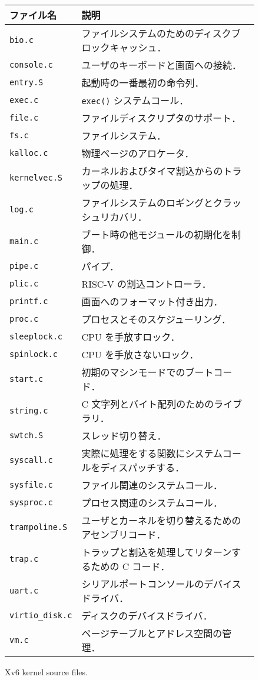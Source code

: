 \begin{figure}[t]
\center
{\footnotesize
  \begin{tabular}{l|l} 
\textbf{ファイル名} & \textbf{説明} \\ \midrule
\texttt{bio.c}         & ファイルシステムのためのディスクブロックキャッシュ．\\
\texttt{console.c}     & ユーザのキーボードと画面への接続．\\
\texttt{entry.S}       & 起動時の一番最初の命令列． \\
\texttt{exec.c}        & \texttt{exec()} システムコール．\\
\texttt{file.c}        & ファイルディスクリプタのサポート．\\
\texttt{fs.c}          & ファイルシステム． \\
\texttt{kalloc.c}      & 物理ページのアロケータ． \\
\texttt{kernelvec.S}   & カーネルおよびタイマ割込からのトラップの処理． \\
\texttt{log.c}         & ファイルシステムのロギングとクラッシュリカバリ．\\
\texttt{main.c}        & ブート時の他モジュールの初期化を制御． \\
\texttt{pipe.c}        & パイプ． \\
\texttt{plic.c}        & RISC-V の割込コントローラ． \\
\texttt{printf.c}      & 画面へのフォーマット付き出力． \\
\texttt{proc.c}        & プロセスとそのスケジューリング． \\
\texttt{sleeplock.c}   & CPU を手放すロック．\\
\texttt{spinlock.c}    & CPU を手放さないロック．\\
\texttt{start.c}       & 初期のマシンモードでのブートコード． \\
\texttt{string.c}      & C 文字列とバイト配列のためのライブラリ． \\
\texttt{swtch.S}       & スレッド切り替え． \\
\texttt{syscall.c}     & 実際に処理をする関数にシステムコールをディスパッチする． \\
\texttt{sysfile.c}     & ファイル関連のシステムコール． \\
\texttt{sysproc.c}     & プロセス関連のシステムコール． \\
\texttt{trampoline.S}  & ユーザとカーネルを切り替えるためのアセンブリコード． \\
\texttt{trap.c}        & トラップと割込を処理してリターンするための C コード． \\
\texttt{uart.c}        & シリアルポートコンソールのデバイスドライバ． \\
\texttt{virtio\_disk.c} & ディスクのデバイスドライバ． \\
\texttt{vm.c}          & ページテーブルとアドレス空間の管理．
  \end{tabular}
}
\caption{Xv6 kernel source files.}
\label{fig:source}
\end{figure}

